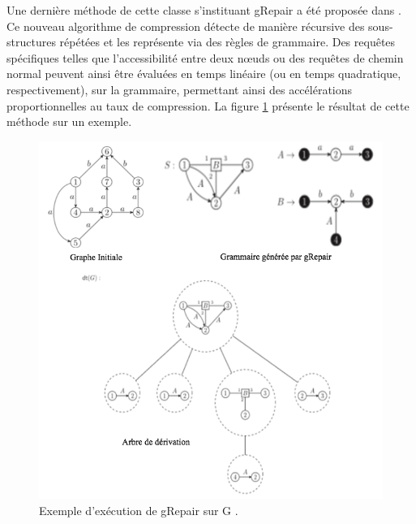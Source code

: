 
	Une dernière méthode de cette classe s'instituant gRepair a été proposée dans \citep{maneth2018grammar}. Ce nouveau algorithme de compression détecte de manière récursive des sous-structures répétées et les représente via des règles de grammaire.  Des requêtes spécifiques telles que l'accessibilité entre deux nœuds ou des requêtes de chemin normal peuvent ainsi être évaluées en temps linéaire (ou en temps quadratique, respectivement), sur la grammaire, permettant ainsi des accélérations proportionnelles au taux de compression. La figure \ref{gRepair} présente le résultat de cette méthode sur un exemple. 
	
	\begin{figure}[h]
			\includegraphics[scale=0.5,center]{./ressources/image/grepair.png}
			\caption[Exemple d'exécution de gRepair sur G.]{Exemple d'exécution de gRepair sur G \citep{maneth2018grammar}.}
			\label{gRepair}
	\end{figure}